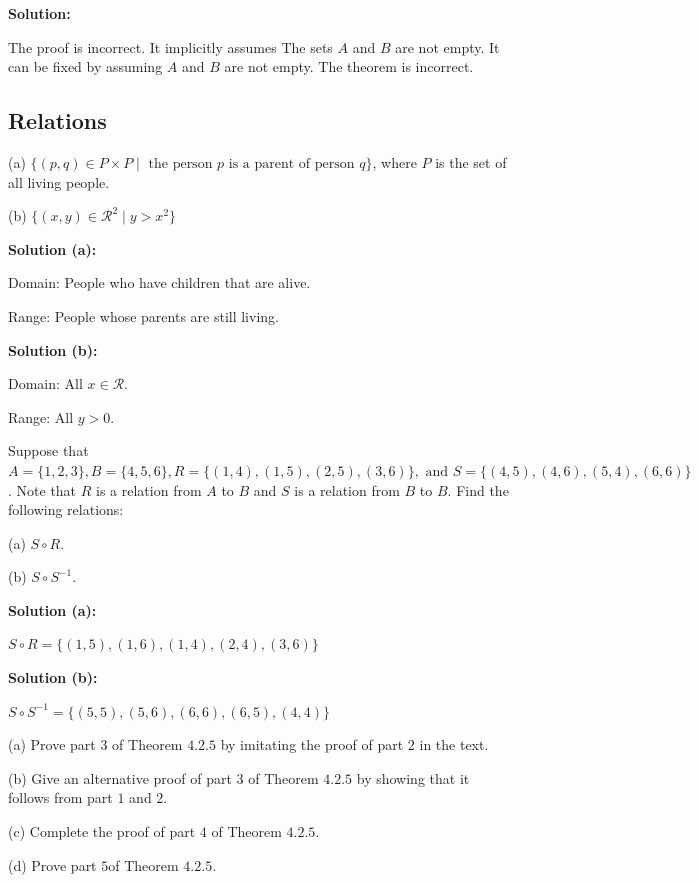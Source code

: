 \textbf{Solution:}

The proof is incorrect. It implicitly assumes The sets $A$ and $B$ are not
empty. It can be fixed by assuming $A$ and $B$ are not empty. The theorem is
incorrect.

\subsection{Relations}

\begin{tcolorbox}[title=Problem 1, breakable]
    (a) $\{(p, q) \in P \times P \mid \text{ the person $p$ is a parent of person $q$}\}$,
    where $P$ is the set of all living people.

    (b) $\{(x, y) \in \mathcal{R}^2 \mid y > x^2\}$
\end{tcolorbox}

\textbf{Solution (a):}

Domain: People who have children that are alive.

Range: People whose parents are still living.

\textbf{Solution (b):}

Domain: All $x \in \mathcal{R}$.

Range: All $y > 0$.

\begin{tcolorbox}[title=Problem 5, breakable]
    Suppose that $A = \{1, 2, 3\}, B = \{4, 5, 6\},
        R = \{(1, 4), (1, 5), (2, 5), (3, 6)\}, \text{ and } S = \{(4, 5), (4, 6), (5, 4), (6, 6)\}$.
    Note that $R$ is a relation from $A$ to $B$ and $S$ is a relation from $B$ to $B$. 
    Find the following relations:

    (a) $S \circ R$.

    (b) $S \circ S^{-1}$.
\end{tcolorbox}

\textbf{Solution (a):}

$S \circ R = \{(1, 5), (1, 6), (1, 4), (2, 4), (3, 6)\}$

\textbf{Solution (b):}

$S \circ S^{-1} = \{(5, 5), (5, 6), (6, 6), (6, 5), (4, 4)\}$

\begin{tcolorbox}[title=Problem 7, breakable]
    (a) Prove part $3$ of Theorem $4.2.5$ by imitating the proof of part $2$ in the text.

    (b) Give an alternative proof of part $3$ of Theorem $4.2.5$ by showing that it follows 
    from part $1$ and $2$.

    (c) Complete the proof of part $4$ of Theorem $4.2.5$.

    (d) Prove part $5$of Theorem $4.2.5$.
\end{tcolorbox}

